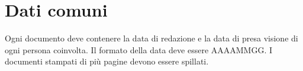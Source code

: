\section{Dati comuni}
Ogni documento deve contenere la data di redazione e la data di presa visione di ogni persona coinvolta. Il formato della data deve essere AAAAMMGG.
I documenti stampati di più pagine devono essere spillati.
